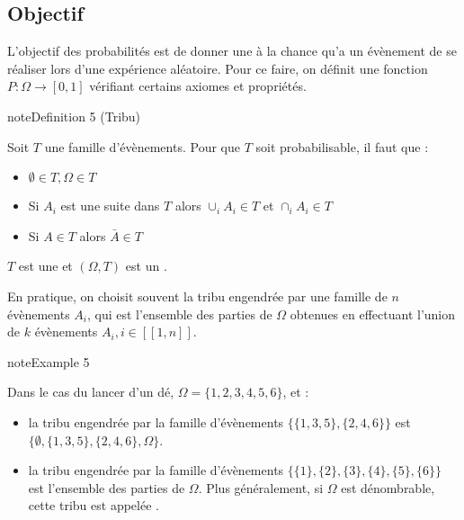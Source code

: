 \documentclass[letterpaper,10pt,english]{jupyterBook}
\begin{document}
\subsection{Objectif}
\label{\detokenize{Rappels:objectif}}
\sphinxAtStartPar
L’objectif des probabilités est de donner une  à la chance qu’a un évènement de se réaliser lors d’une expérience aléatoire. Pour ce faire, on définit une fonction \(P:\Omega\rightarrow [0,1]\) vérifiant certains axiomes et propriétés.

\ignorespaces \label{Rappels:tribu}
\begin{sphinxadmonition}{note}{Definition 5 (Tribu)}



\sphinxAtStartPar
Soit \(T\) une famille d’évènements. Pour que \(T\) soit probabilisable, il faut que :
\begin{itemize}
\item {} 
\sphinxAtStartPar
\(\emptyset\in T, \Omega\in T\)

\item {} 
\sphinxAtStartPar
Si \(A_i\) est une suite dans \(T\) alors \(\cup_iA_i\in T\) et \(\cap_iA_i\in T\)

\item {} 
\sphinxAtStartPar
Si \(A\in T\) alors \(\bar A\in T\)

\end{itemize}

\sphinxAtStartPar
\(T\) est une  et \((\Omega,T)\) est un .
\end{sphinxadmonition}

\sphinxAtStartPar
En pratique, on choisit souvent la tribu engendrée par une famille de \(n\) évènements \(A_i\), qui est l’ensemble des parties de \(\Omega\) obtenues en effectuant l’union de \(k\) évènements \(A_i,i\in [\![1,n]\!]\).
\label{Rappels:example-8}
\begin{sphinxadmonition}{note}{Example 5}



\sphinxAtStartPar
Dans le cas du lancer d’un dé, \(\Omega = \{1,2,3,4,5,6\}\), et :
\begin{itemize}
\item {} 
\sphinxAtStartPar
la tribu engendrée par la famille d’évènements \(\{\{1,3,5\},\{2,4,6\}\}\) est \(\{\emptyset,\{1,3,5\},\{2,4,6\},\Omega\}\).

\item {} 
\sphinxAtStartPar
la tribu engendrée par la famille d’évènements \(\{\{1\},\{2\},\{3\},\{4\},\{5\},\{6\}\}\) est l’ensemble des parties de \(\Omega\). Plus généralement, si \(\Omega\) est dénombrable, cette tribu est appelée .

\end{itemize}
\end{sphinxadmonition}
\end{document}
